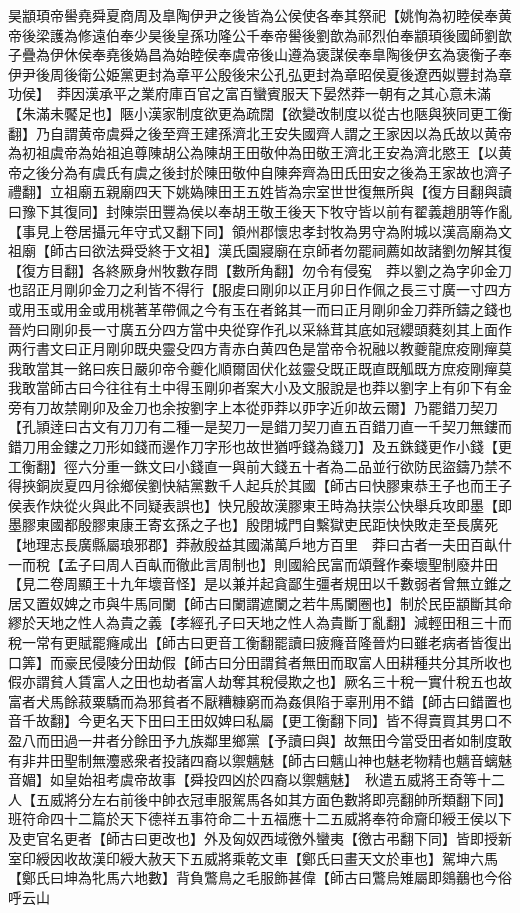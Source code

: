 昊顓頊帝嚳堯舜夏商周及臯陶伊尹之後皆為公侯使各奉其祭祀【姚恂為初睦侯奉黄帝後梁護為修遠伯奉少昊後皇孫功隆公千奉帝嚳後劉歆為祁烈伯奉顓頊後國師劉歆子疊為伊休侯奉堯後媯昌為始睦侯奉虞帝後山遵為褒謀侯奉臯陶後伊玄為褒衡子奉伊尹後周後衛公姫黨更封為章平公殷後宋公孔弘更封為章昭侯夏後遼西姒豐封為章功侯】　莽因漢承平之業府庫百官之富百蠻賓服天下晏然莽一朝有之其心意未滿【朱滿未饜足也】陿小漢家制度欲更為疏闊【欲變改制度以從古也陿與狹同更工衡翻】乃自謂黄帝虞舜之後至齊王建孫濟北王安失國齊人謂之王家因以為氏故以黄帝為初祖虞帝為始祖追尊陳胡公為陳胡王田敬仲為田敬王濟北王安為濟北愍王【以黄帝之後分為有虞氏有虞之後封於陳田敬仲自陳奔齊為田氏田安之後為王家故也濟子禮翻】立祖廟五親廟四天下姚媯陳田王五姓皆為宗室世世復無所與【復方目翻與讀曰豫下其復同】封陳崇田豐為侯以奉胡王敬王後天下牧守皆以前有翟義趙朋等作亂【事見上卷居攝元年守式又翻下同】領州郡懷忠孝封牧為男守為附城以漢高廟為文祖廟【師古曰欲法舜受終于文祖】漢氏園寢廟在京師者勿罷祠薦如故諸劉勿解其復【復方目翻】各終厥身州牧數存問【數所角翻】勿令有侵寃　莽以劉之為字卯金刀也詔正月剛卯金刀之利皆不得行【服䖍曰剛卯以正月卯日作佩之長三寸廣一寸四方或用玉或用金或用桃著革帶佩之今有玉在者銘其一而曰正月剛卯金刀莽所鑄之錢也晉灼曰剛卯長一寸廣五分四方當中央從穿作孔以采絲茸其底如冠纓頭蕤刻其上面作两行書文曰正月剛卯既央靈殳四方青赤白黄四色是當帝令祝融以教夔龍庶疫剛癉莫我敢當其一銘曰疾日嚴卯帝令夔化順爾固伏化兹靈殳既正既直既觚既方庶疫剛癉莫我敢當師古曰今往往有土中得玉剛卯者案大小及文服說是也莽以劉字上有卯下有金旁有刀故禁剛卯及金刀也余按劉字上本從丣莽以丣字近卯故云爾】乃罷錯刀契刀【孔頴逹曰古文有刀刀有二種一是契刀一是錯刀契刀直五百錯刀直一千契刀無鏤而錯刀用金鏤之刀形如錢而邊作刀字形也故世猶呼錢為錢刀】及五銖錢更作小錢【更工衡翻】徑六分重一銖文曰小錢直一與前大錢五十者為二品並行欲防民盜鑄乃禁不得挾銅炭夏四月徐鄉侯劉快結黨數千人起兵於其國【師古曰快膠東恭王子也而王子侯表作炔從火與此不同疑表誤也】快兄殷故漢膠東王時為扶崇公快舉兵攻即墨【即墨膠東國都殷膠東康王寄玄孫之子也】殷閉城門自繫獄吏民距快快敗走至長廣死【地理志長廣縣屬琅邪郡】莽赦殷益其國滿萬戶地方百里　莽曰古者一夫田百畒什一而稅【孟子曰周人百畒而徹此言周制也】則國給民富而頌聲作秦壞聖制廢井田【見二卷周顯王十九年壞音怪】是以兼并起貪鄙生彊者規田以千數弱者曾無立錐之居又置奴婢之市與牛馬同闌【師古曰闌謂遮闌之若牛馬闌圈也】制於民臣顓斷其命繆於天地之性人為貴之義【孝經孔子曰天地之性人為貴斷丁亂翻】減輕田租三十而稅一常有更賦罷癃咸出【師古曰更音工衡翻罷讀曰疲癃音隆晉灼曰雖老病者皆復出口筭】而豪民侵陵分田劫假【師古曰分田謂貧者無田而取富人田耕種共分其所收也假亦謂貧人賃富人之田也劫者富人劫奪其稅侵欺之也】厥名三十稅一實什稅五也故富者犬馬餘菽粟驕而為邪貧者不厭糟糠窮而為姦俱陷于辜刑用不錯【師古曰錯置也音千故翻】今更名天下田曰王田奴婢曰私屬【更工衡翻下同】皆不得賣買其男口不盈八而田過一井者分餘田予九族鄰里鄉黨【予讀曰與】故無田今當受田者如制度敢有非井田聖制無灋惑衆者投諸四裔以禦魑魅【師古曰魑山神也魅老物精也魑音螭魅音媚】如皇始祖考虞帝故事【舜投四凶於四裔以禦魑魅】　秋遣五威將王奇等十二人【五威將分左右前後中帥衣冠車服駕馬各如其方面色數將即亮翻帥所類翻下同】班符命四十二篇於天下德祥五事符命二十五福應十二五威將奉符命齎印綬王侯以下及吏官名更者【師古曰更改也】外及匈奴西域徼外蠻夷【徼古弔翻下同】皆即授新室印綬因收故漢印綬大赦天下五威將乘乾文車【鄭氏曰畫天文於車也】駕坤六馬【鄭氏曰坤為牝馬六地數】背負鷩鳥之毛服飾甚偉【師古曰鷩烏雉屬即鵕䴊也今俗呼云山